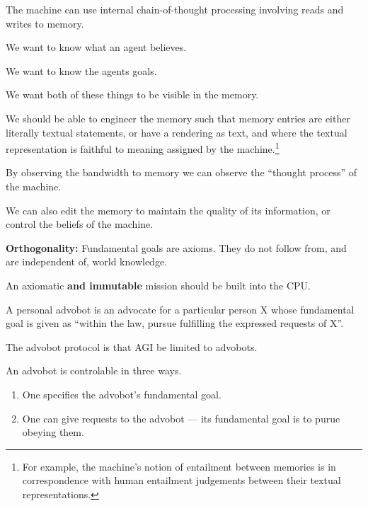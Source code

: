 {\vfill
The machine can use internal chain-of-thought processing involving reads and writes to memory.



We want to know what an agent believes.

\vfill
We want to know the agents goals.

\vfill
We want both of these things to be visible in the memory.


\vfill
We should be able to engineer the memory such that memory entries are either literally textual statements,
or have a rendering as text, and where the textual representation is faithful to meaning assigned by the machine.\footnote{\Large For example, the machine's notion of entailment
between memories is in correspondence with human entailment judgements between their textual representations.}

\vfill
By observing the bandwidth to memory we can observe the ``thought process'' of the machine.

\vfill
We can also edit the memory to maintain the quality of its information, or control the beliefs of the machine.


{\bf Orthogonality:} Fundamental goals are axioms.  They do not follow from, and are independent of, world knowledge.

\vfill
An axiomatic {\bf and immutable} mission should be built into the CPU.


A personal advobot is an advocate for a particular person X whose fundamental goal is given as ``within the law, pursue fulfilling the expressed requests of X''.

\vfill
The advobot protocol is that AGI be limited to advobots.


An advobot is controlable in three ways.

\vfill
\begin{enumerate}
\item One specifies the advobot's fundamental goal.

\vfill
\item One can give requests to the advobot --- its fundamental goal is to purue obeying them.


\end{enumerate}}
